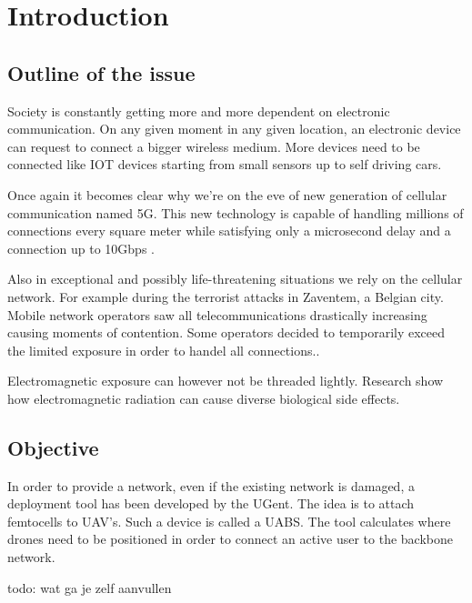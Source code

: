 %

\chapter{Introduction}
\label{chap:intro}

\section{Outline of the issue}
\label{sec:issue}

Society is constantly getting more and more dependent on electronic communication. On any given moment in any given location, an electronic device
can request to connect a bigger wireless medium. More devices need to be connected like IOT devices starting from small sensors up to self driving cars.

Once again it becomes clear why we're on the eve of new generation of cellular communication named 5G. 
This new technology is capable of handling millions of connections every square meter %
while satisfying only a microsecond delay and a connection up to 10Gbps \cite{bioeffects}.

Also in exceptional and possibly life-threatening situations we rely on the cellular network. For example during the terrorist attacks in Zaventem, a Belgian city.
Mobile network operators saw all telecommunications drastically increasing causing moments of contention. Some operators decided to temporarily exceed the limited exposure in
order to handel all connections.. \cite{baseZaventem}

Electromagnetic exposure can however not be threaded lightly. Research show how electromagnetic radiation can cause diverse biological side effects. \cite{bio-effects}

\section{Objective}
\label{sec:objective}

In order to provide a network, even if the existing network is damaged, a deployment tool has been developed by the UGent. The idea is to 
attach femtocells to UAV's. Such a device is called a \gls{UABS}. The tool calculates where drones need to be positioned in order to connect an active user to the backbone network.


todo: wat ga je zelf aanvullen